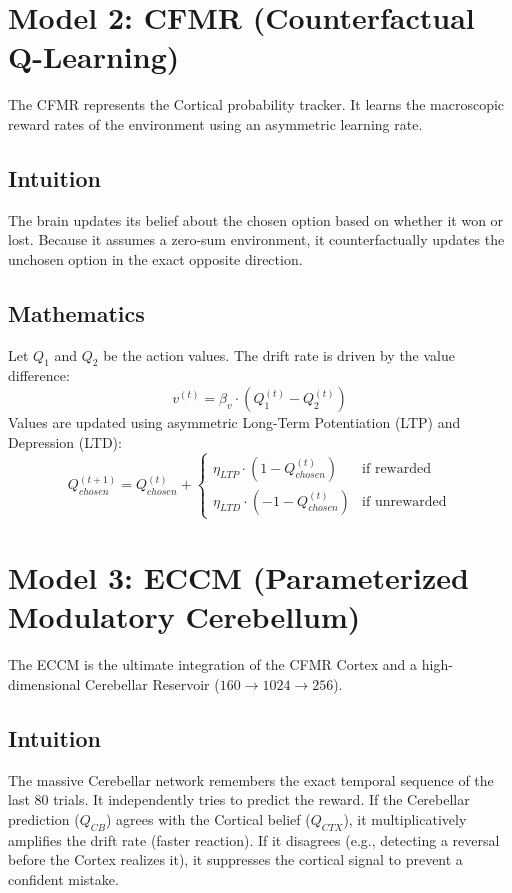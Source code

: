 \documentclass[11pt,a4paper]{article}
\begin{document}
\section{Model 2: CFMR (Counterfactual Q-Learning)}
The CFMR represents the Cortical probability tracker. It learns the macroscopic reward rates of the environment using an asymmetric learning rate.
\subsection{Intuition}
The brain updates its belief about the chosen option based on whether it won or lost. Because it assumes a zero-sum environment, it counterfactually updates the unchosen option in the exact opposite direction.
\subsection{Mathematics}
Let $Q_{1}$ and $Q_{2}$ be the action values. The drift rate is driven by the value difference:
\begin{equation}
    v^{(t)} = \beta_v \cdot (Q_1^{(t)} - Q_2^{(t)})
\end{equation}
Values are updated using asymmetric Long-Term Potentiation (LTP) and Depression (LTD):
\begin{equation}
Q_{chosen}^{(t+1)} = Q_{chosen}^{(t)} + \begin{cases} 
\eta_{LTP} \cdot (1 - Q_{chosen}^{(t)}) & \text{if rewarded} \\
\eta_{LTD} \cdot (-1 - Q_{chosen}^{(t)}) & \text{if unrewarded}
\end{cases}
\end{equation}

\section{Model 3: ECCM (Parameterized Modulatory Cerebellum)}
The ECCM is the ultimate integration of the CFMR Cortex and a high-dimensional Cerebellar Reservoir ($160 \to 1024 \to 256$).
\subsection{Intuition}
The massive Cerebellar network remembers the exact temporal sequence of the last 80 trials. It independently tries to predict the reward. If the Cerebellar prediction ($Q_{CB}$) agrees with the Cortical belief ($Q_{CTX}$), it multiplicatively amplifies the drift rate (faster reaction). If it disagrees (e.g., detecting a reversal before the Cortex realizes it), it suppresses the cortical signal to prevent a confident mistake.
\end{document}
